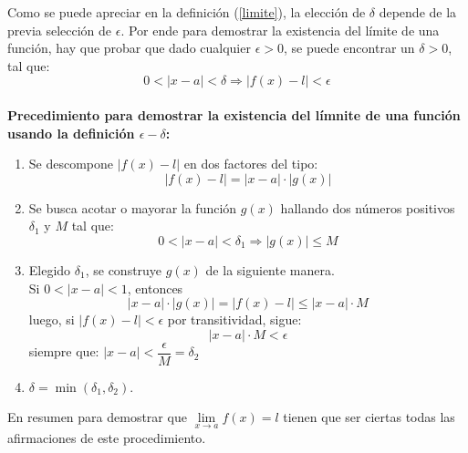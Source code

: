 \documentclass[10pt,twoside]{SelfArx} %
\begin{document}
Como se puede apreciar en la definición (\ref{limite}), la elección de $ \delta $ depende de la previa selección de $ \epsilon $. Por ende para demostrar la existencia del límite de una función, hay que probar que dado cualquier $ \epsilon>0 $, se puede encontrar un $ \delta>0 $, tal que:
\[ 	 0<|x-a|<\delta\Rightarrow |f(x)-l|<\epsilon  \]
\\
\textbf{Precedimiento para demostrar la existencia del límnite de una función usando la definición $ \epsilon-\delta $:}\\
\begin{enumerate}
	\item Se descompone $ |f(x)-l| $ en dos factores del tipo:
	\[ |f(x)-l|=|x-a|\cdot|g(x)| \]
	\item Se busca acotar o mayorar la funci\'on $ g(x) $ hallando dos números positivos $ \delta_{1} $ y $ M $ tal que:
	\[ 0<|x-a|<\delta_{1}\Rightarrow |g(x)|\leq M \]
	\item Elegido $ \delta_{1} $, se construye $ g(x) $ de la siguiente manera.\\
		Si $ 0<|x-a|<1 $, entonces 
		 \[ |x-a|\cdot|g(x)|=|f(x)-l|\leq|x-a|\cdot M \] 
		 luego, si $ |f(x)-l|<\epsilon $ por transitividad, sigue:
		 \[ |x-a|\cdot M<\epsilon \]
		 siempre que:
		 $ |x-a|<\dfrac{\epsilon}{M}=\delta_{2} $
		 
		 
		 \item $ \delta=\min(\delta_{1},\delta_{2} ) $.
\end{enumerate}
En resumen para demostrar que $ \lim\limits_{x\rightarrow a}f(x)=l $ tienen que ser ciertas todas las afirmaciones de este procedimiento.
\end{document}
